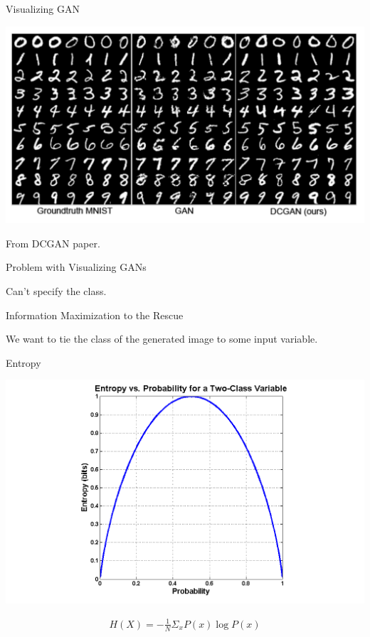 \documentclass{beamer}
\begin{document}
\begin{frame}{Visualizing GAN}{}

  \begin{center}
    \includegraphics[height=0.6\textheight]{dcgan}
  \end{center}
  
  From DCGAN paper.

\end{frame}

\begin{frame}{Problem with Visualizing GANs}{}

  Can't specify the class.

\end{frame}

\begin{frame}{Information Maximization to the Rescue}{}

  We want to tie the class of the generated image to some input variable.

\end{frame}

\begin{frame}{Entropy}{}

  \begin{center}
    \includegraphics[height=0.6\textheight]{entropy}
  \end{center}

    \begin{align*}
        H(X) = - \frac{1}{N} \Sigma_x P(x) \log P(x)
    \end{align*}
    

\end{frame}
\end{document}
